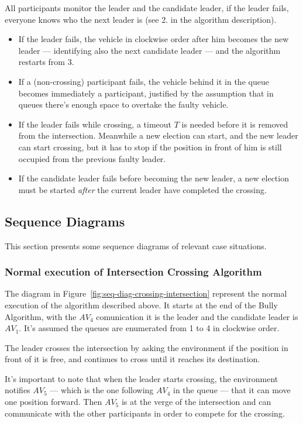 \documentclass{memoir}
\begin{document}
All participants monitor the leader and the candidate leader, if the leader fails, everyone knows who the next leader is (see 2. in the algorithm description).

\begin{itemize}
	\item If the leader fails, the vehicle in clockwise order after him becomes the new leader --- identifying also the next candidate leader --- and the algorithm restarts from 3.
	\item If a (non-crossing) participant fails, the vehicle behind it in the queue becomes immediately a participant, justified by the assumption that in queues there's enough space to overtake the faulty vehicle.
	\item If the leader fails while crossing, a timeout $T$ is needed before it is removed from the intersection. Meanwhile a new election can start, and the new leader can start crossing, but it has to stop if the position in front of him is still occupied from the previous faulty leader.
	\item If the candidate leader fails before becoming the new leader, a new election must be started \emph{after} the current leader have completed the crossing.
\end{itemize}

\subsection{Sequence Diagrams}
This section presents some sequence diagrams of relevant case situations.

\subsubsection{Normal execution of Intersection Crossing Algorithm}
The diagram in Figure~\ref{fig:seq-diag-crossing-intersection} represent the normal execution of the algorithm described above. It starts at the end of the Bully Algorithm, with the $AV_4$ comunication it is the leader and the candidate leader is $AV_1$. It's assumed the queues are enumerated from 1 to 4 in clockwise order.

The leader crosses the intersection by asking the environment if the position in front of it is free, and continues to cross until it reaches its destination.

It's important to note that when the leader starts crossing, the environment notifies $AV_5$ --- which is the one following $AV_4$ in the queue --- that it can move one position forward. Then $AV_5$ is at the verge of the intersection and can communicate with the other participants in order to compete for the crossing.
\end{document}
